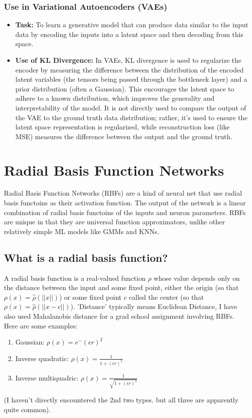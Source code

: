 \documentclass[12pt]{article}
\begin{document}
\subsubsection{Use in Variational Autoencoders (VAEs)}
\begin{itemize}
    \item \textbf{Task:} To learn a generative model that can produce data similar to the input data by encoding the inputs into a latent space and then decoding from this space.
    \item \textbf{Use of KL Divergence:} In VAEs, KL divergence is used to regularize the encoder by measuring the difference between the distribution of the encoded latent variables (the tensors being passed through the bottleneck layer) and a prior distribution (often a Gaussian). This encourages the latent space to adhere to a known distribution, which improves the generality and interpretability of the model. It is not directly used to compare the output of the VAE to the ground truth data distribution; rather, it's used to ensure the latent space representation is regularized, while reconstruction loss (like MSE) measures the difference between the output and the ground truth.
\end{itemize}

\section {Radial Basis Function Networks}
Radial Basis Function Networks (RBFs) are a kind of neural net that use radial basis functoins as their activation function. The output of the network is a linear combination of radial basis functoins of the inputs and neuron parameters. RBFs are unique in that they are universal function approximators, unlike other relatively simple ML models like GMMs and KNNs. 

\subsection{What is a radial basis function?}
A radial basis function is a real-valued function \(\rho\) whose value depends only on the distance between the input and some fixed point, either the origin (so that \(\rho(x) = \hat{\rho}(||x||)\)) or some fixed point \(c\) called the center (so that \(\rho(x) = \hat{\rho}(||x-c||)\)). 'Distance' typically means Euclidean Distance, I have also used Mahalanobis distance for a grad school assignment involving RBFs. Here are some examples:
\begin{enumerate}
\item Gaussian: \(\rho(x) = e^-{(\epsilon r)^2}\)
\item Inverse quadratic: \(\rho(x) = \frac{1}{1 + (\epsilon r)^2}\)
\item Inverse multiquadric: \(\rho(x) = \frac{1}{\sqrt{1 + (\epsilon r)^2}}\)
\end{enumerate}
(I haven't directly encountered the 2nd two types. but all three are apparently quite common).
\end{document}
